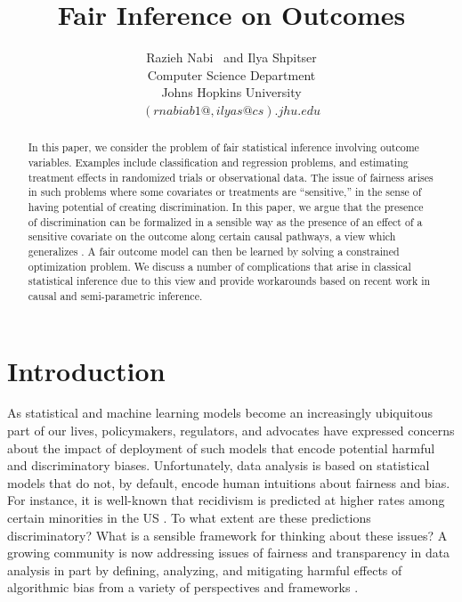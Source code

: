 \documentclass[letterpaper]{article} %
\title{Fair Inference on Outcomes}
\author{Razieh Nabi \ and Ilya Shpitser\\
Computer Science Department\\
Johns Hopkins University  \\
$(rnabiab1@, ilyas@cs).jhu.edu$
}
\newcommand{\citep}{\cite}
\begin{document}
\maketitle

\begin{abstract}

In this paper, we consider the problem of fair statistical inference involving outcome variables.  Examples include classification and regression problems, and estimating treatment effects in randomized trials or observational data.  The issue of fairness arises in such problems where some covariates or treatments are ``sensitive,'' in the sense of having potential of creating discrimination.  In this paper, we argue that the presence of discrimination can be formalized in a sensible way as the presence of an effect of a sensitive covariate on the outcome along certain causal pathways, a view which generalizes \citep{pearl09causality}. A fair outcome model can then be learned by solving a constrained optimization problem. We discuss a number of complications that arise in classical statistical inference due to this view and provide workarounds based on recent work in causal and semi-parametric inference. 

\end{abstract}

\section{Introduction}
\label{sec:intro}

As statistical and machine learning models become an increasingly ubiquitous part of our lives, policymakers, regulators, and advocates have expressed concerns about the impact of deployment of such models that encode potential harmful and discriminatory biases. Unfortunately, data analysis is based on statistical models that do not, by default, encode human intuitions about fairness and bias.  For instance, it is well-known that recidivism is predicted at higher rates among certain minorities in the US \citep{propublica}. To what extent are these predictions discriminatory?  What is a sensible framework for thinking about these issues?  
A growing community is now addressing issues of fairness and transparency in data analysis in part by defining, analyzing, and mitigating harmful effects of algorithmic bias from a variety of perspectives and frameworks \citep{pedreshi08discrimination,feldman15certifying,hardt16equality,kamiran13quantifying,corbett-davies17algorithmic,jabbari16fair}.
\end{document}
